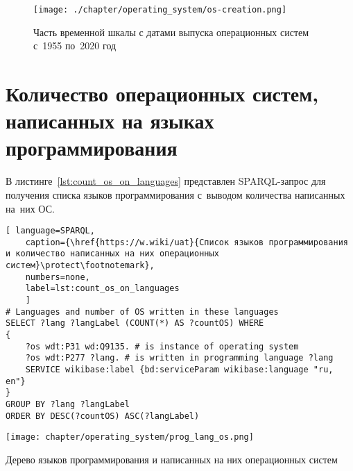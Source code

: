 \begin{figure*}[h!]
	\texttt{[image: ./chapter/operating\_system/os-creation.png]}
    \caption[Часть временной шкалы с датами выпуска ОС.]{
        Часть временной шкалы с датами выпуска операционных систем\\с~1955 по~2020 год}%
	\label{fig:os_creation}
\end{figure*}





\section{Количество операционных систем, написанных на языках программирования}

В листинге~\ref{lst:count_os_on_languages} представлен SPARQL-запрос для получения 
списка языков программирования с~выводом количества написанных на~них ОС.

\begin{lstlisting}[ language=SPARQL, 
	caption={\href{https://w.wiki/uat}{Список языков программирования и количество написанных на них операционных систем}\protect\footnotemark},
    numbers=none,
	label=lst:count_os_on_languages
	]
# Languages and number of OS written in these languages
SELECT ?lang ?langLabel (COUNT(*) AS ?countOS) WHERE 
{
	?os wdt:P31 wd:Q9135. # is instance of operating system
	?os wdt:P277 ?lang. # is written in programming language ?lang
    SERVICE wikibase:label {bd:serviceParam wikibase:language "ru, en"}
}
GROUP BY ?lang ?langLabel
ORDER BY DESC(?countOS) ASC(?langLabel)
\end{lstlisting}



\newpage\phantom{blabla}
\newpage
%
\begin{marginfigure}[0\baselineskip]
    \texttt{[image: chapter/operating\_system/prog\_lang\_os.png]}
    \caption[Дерево языков программирования и написанных на них ОС.]{Дерево языков программирования и написанных на них операционных систем}
	\label{fig:prog_lang_os}%
\end{marginfigure}
%

